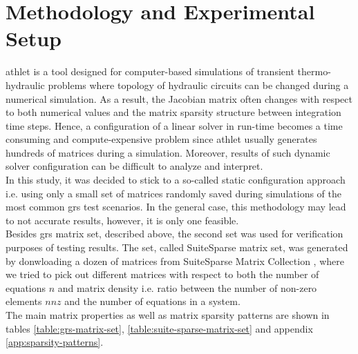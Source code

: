 \chapter{Methodology and Experimental Setup}\label{subseq:matrix-sets-and-hardware}

\acrshort{athlet} is a tool designed for computer-based simulations of transient thermo-hydraulic problems where topology of hydraulic circuits can be changed during a numerical simulation. As a result, the Jacobian matrix often changes with respect to both numerical values and the matrix sparsity structure between integration time steps. Hence, a configuration of a linear solver in run-time becomes a time consuming and compute-expensive problem since \acrshort{athlet} usually generates hundreds of matrices during a simulation. Moreover, results of such dynamic solver configuration can be difficult to analyze and interpret.\\


In this study, it was decided to stick to a so-called static configuration approach i.e. using only a small set of matrices randomly saved during simulations of the most common \acrshort{grs} test scenarios. In the general case, this methodology may lead to not accurate results, however, it is only one feasible.\\


Besides \acrshort{grs} matrix set, described above, the second set was  used for verification purposes of testing results. The set, called SuiteSparse matrix set, was generated by donwloading a dozen of matrices from SuiteSparse Matrix Collection \cite{sparse-matrix-collection:1}, \cite{sparse-matrix-collection:2} where we tried to pick out different matrices with respect to both the number of equations $n$ and matrix density i.e. ratio between the number of non-zero elements $nnz$ and the number of equations in a system.\\ 


The main matrix properties as well as matrix sparsity patterns are shown in tables \ref{table:grs-matrix-set}, \ref{table:suite-sparse-matrix-set} and appendix \ref{app:sparsity-patterns}.\\


